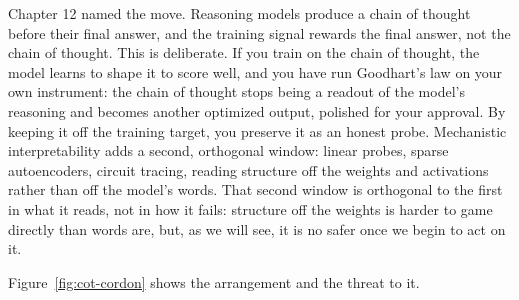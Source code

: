 Chapter 12 named the move. Reasoning models produce a chain of thought before their final answer, and the training signal rewards the final answer, not the chain of thought. This is deliberate. If you train on the chain of thought, the model learns to shape it to score well, and you have run Goodhart's law on your own instrument: the chain of thought stops being a readout of the model's reasoning and becomes another optimized output, polished for your approval. By keeping it off the training target, you preserve it as an honest probe. Mechanistic interpretability adds a second, orthogonal window: linear probes, sparse autoencoders, circuit tracing, reading structure off the weights and activations rather than off the model's words. That second window is orthogonal to the first in what it reads, not in how it fails: structure off the weights is harder to game directly than words are, but, as we will see, it is no safer once we begin to act on it.

Figure~\ref{fig:cot-cordon} shows the arrangement and the threat to it.

